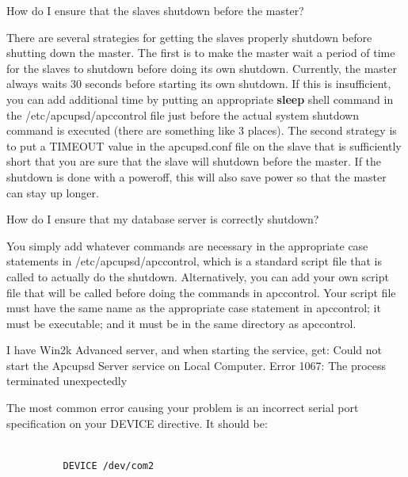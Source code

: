 {{{{{{{{{\begin{description}
{{{\item [Q:]
   How do I ensure that the slaves shutdown before the master?  

\item [A:]
   There are several strategies for getting the slaves properly shutdown before
shutting down the master. The first is to make the master wait a period of
time for the slaves to shutdown before doing its own shutdown. Currently, the
master always waits 30 seconds before starting its own shutdown. If this is
insufficient, you can add additional time by putting an appropriate {\bf
sleep} shell command in the /etc/apcupsd/apccontrol file just before the
actual system shutdown command is executed (there are something like 3
places). The second strategy is to put a TIMEOUT value in the apcupsd.conf
file on the slave that is sufficiently short that you are sure that the slave
will shutdown before the master. If the shutdown is done with a poweroff, this
will also save power so that the master can stay up longer.  

\item [Q:]
   How do I ensure that my database server is correctly shutdown?  

\item [A:]
   You simply add whatever commands are necessary in the appropriate case
statements in /etc/apcupsd/apccontrol, which is a standard script file that is
called to actually do the shutdown. Alternatively, you can add your own script
file that will be called before doing the commands in apccontrol. Your script
file must have the same name as the appropriate case statement in apccontrol;
it must be executable; and it must be in the same directory as apccontrol.  

\item [Q:]
   I have Win2k Advanced server, and when starting the service, get: Could not
start the Apcupsd Server service on Local Computer. Error 1067: The process
terminated unexpectedly  

\item [A:]
   The most common error causing your problem is an incorrect serial port
specification on your DEVICE directive. It should be:  

\footnotesize
\begin{verbatim}
          
          DEVICE /dev/com2
     
\end{verbatim}
\normalsize

}}}
\end{description}}}}}}}}}}
